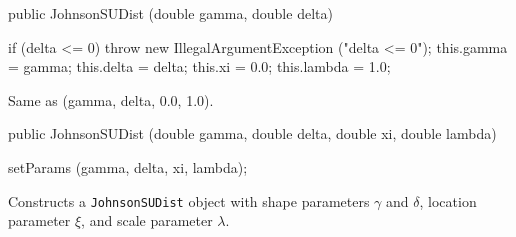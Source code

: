 \begin{code}

   public JohnsonSUDist (double gamma, double delta)\begin{hide} {
      if (delta <= 0)
         throw new IllegalArgumentException ("delta <= 0");
      this.gamma = gamma;
      this.delta = delta;
      this.xi = 0.0;
      this.lambda = 1.0;
   }\end{hide}
\end{code}
  \begin{tabb} 
    Same as 
    {(gamma, delta, 0.0, 1.0)}.
  \end{tabb}
\begin{code}

   public JohnsonSUDist (double gamma, double delta,
                         double xi, double lambda)\begin{hide} {
      setParams (gamma, delta, xi, lambda);
   }\end{hide}
\end{code}
  \begin{tabb} Constructs a \texttt{JohnsonSUDist} object
   with shape parameters $\gamma$ and $\delta$,
   location parameter $\xi$, and scale parameter $\lambda$.
  \end{tabb}

